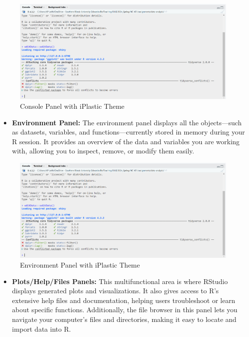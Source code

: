 \documentclass[
]{book}
\providecommand{\tightlist}{%
  \setlength{\itemsep}{0pt}\setlength{\parskip}{0pt}}
\begin{document}
\begin{figure}
\centering
\includegraphics[width=1\linewidth,height=\textheight,keepaspectratio]{images/console-panel.png}
\caption{Console Panel with iPlastic Theme}
\end{figure}

\begin{itemize}
\tightlist
\item
  \textbf{Environment Panel:} The environment panel displays all the objects---such as datasets, variables, and functions---currently stored in memory during your R session. It provides an overview of the data and variables you are working with, allowing you to inspect, remove, or modify them easily.
\end{itemize}

\begin{figure}
\centering
\includegraphics[width=1\linewidth,height=\textheight,keepaspectratio]{images/environment-panel.png}
\caption{Environment Panel with iPlastic Theme}
\end{figure}

\begin{itemize}
\tightlist
\item
  \textbf{Plots/Help/Files Panels:} This multifunctional area is where RStudio displays generated plots and visualizations. It also gives access to R's extensive help files and documentation, helping users troubleshoot or learn about specific functions. Additionally, the file browser in this panel lets you navigate your computer's files and directories, making it easy to locate and import data into R.
\end{itemize}
\end{document}
